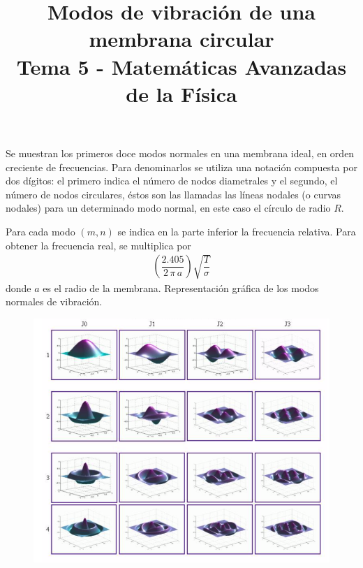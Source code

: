 
\setlength{\jot}{12pt}
\title{Modos de vibración de una membrana circular \\ {\large Tema 5 - Matemáticas Avanzadas de la Física}\vspace{-1.5\baselineskip}}
\author{}
\date{}

\maketitle
\fontsize{14}{14}\selectfont
Se muestran los primeros doce modos normales en una membrana ideal, en orden creciente de frecuencias. Para denominarlos se utiliza una notación compuesta por dos dígitos: el primero indica el número de nodos diametrales y el segundo, el número de nodos circulares, éstos son las llamadas las líneas nodales (o curvas nodales) para un determinado modo normal, en este caso el círculo de radio $R$.
\begin{figure}[H]
    \centering
    
\end{figure}
Para cada modo $(m, n)$ se indica en la parte inferior la frecuencia relativa. Para obtener la frecuencia real, se multiplica por
\begin{align*}
\left( \dfrac{2.405}{2 \, \pi \, a} \right) \sqrt{\dfrac{T}{\sigma}}
\end{align*}
donde $a$ es el radio de la membrana.
\newpage
Representación gráfica de los modos normales de vibración.
\begin{figure}[H]
    \centering
    \hspace{-1.5cm}
    \includegraphics[scale=0.65]{Imagenes/Modos_Normales_Membrana_Circular.png}
\end{figure}
